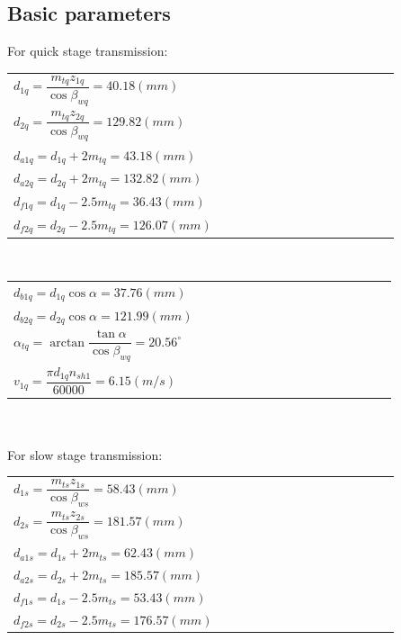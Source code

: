 
\subsection{Basic parameters}

For quick stage transmission:\\
\begin{tabular}[t]{p{0.5\linewidth}}
	$ d_{1q} = \dfrac{m_{tq}z_{1q}}{\cos\beta_{wq}} = 40.18\unit{(mm)} $\\
	$ d_{2q} = \dfrac{m_{tq}z_{2q}}{\cos\beta_{wq}} = 129.82\unit{(mm)} $\\
	$ d_{a1q} = d_{1q} + 2m_{tq} = 43.18\unit{(mm)}$\\
	$ d_{a2q} = d_{2q} + 2m_{tq} = 132.82\unit{(mm)}$\\
	$ d_{f1q} = d_{1q} - 2.5m_{tq} = 36.43\unit{(mm)}$\\
	$ d_{f2q} = d_{2q} - 2.5m_{tq} = 126.07\unit{(mm)}$\\
\end{tabular}~
\begin{tabular}[t]{p{0.5\linewidth}}
	$ d_{b1q} = d_{1q}\cos\alpha = 37.76\unit{(mm)}$\\
	$ d_{b2q} = d_{2q}\cos\alpha = 121.99 \unit{(mm)}$\\
	$ \alpha_{tq} = \arctan\dfrac{\tan\alpha}{\cos\beta_{wq}} = 20.56^\circ $\\
	$ v_{1q} = \dfrac{\pi d_{1q}n_{sh1}}{60000} = 6.15\unit{(m/s)}$
\end{tabular}\\\\
For slow stage transmission:\\
\begin{tabular}[t]{p{0.5\linewidth}}
	$ d_{1s} = \dfrac{m_{ts}z_{1s}}{\cos\beta_{ws}} = 58.43\unit{(mm)} $\\
	$ d_{2s} = \dfrac{m_{ts}z_{2s}}{\cos\beta_{ws}} = 181.57\unit{(mm)} $\\
	$ d_{a1s} = d_{1s} + 2m_{ts} = 62.43\unit{(mm)}$\\
	$ d_{a2s} = d_{2s} + 2m_{ts} = 185.57\unit{(mm)}$\\
	$ d_{f1s} = d_{1s} - 2.5m_{ts} = 53.43\unit{(mm)}$\\
	$ d_{f2s} = d_{2s} - 2.5m_{ts} = 176.57\unit{(mm)}$\\
\end{tabular}~
